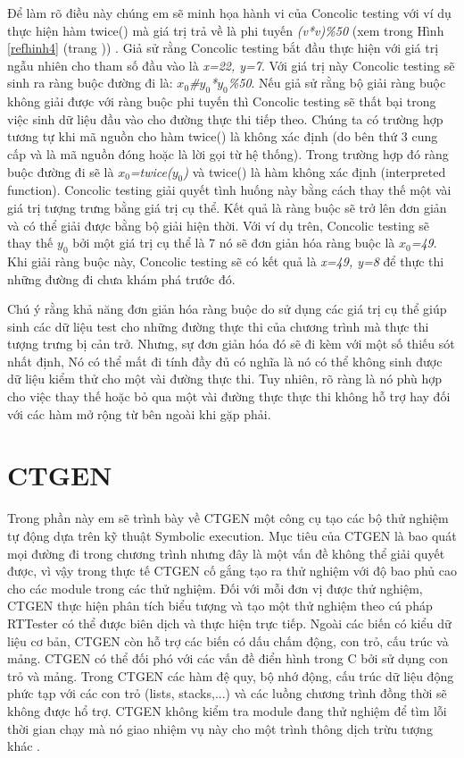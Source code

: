 \documentclass[12pt,a4paper]{report}
\begin{document}
\begin{enumerate}
Để làm rõ điều này chúng em sẽ minh họa hành vi của Concolic testing với ví dụ thực hiện hàm twice() mà giá trị trả về là phi tuyến \textit{(v*v)\%50} (xem trong Hình \ref{refhinh4} (trang \pageref{refhinh4})) . Giả sử rằng Concolic testing bắt đầu thực hiện với giá trị ngẫu nhiên cho tham số đầu vào là \textit{{x=22, y=7}}. Với giá trị này Concolic testing sẽ sinh ra ràng buộc đường đi là:  \textit{$x_0$\#$y_0$*$y_0$\%50}. Nếu giả sử rằng bộ giải ràng buộc không giải được với ràng buộc phi tuyến thì Concolic testing sẽ thất bại trong việc sinh dữ liệu đầu vào cho đường thực thi tiếp theo. Chúng ta có trường hợp tương tự khi mã nguồn cho hàm twice() là không xác định (do bên thứ 3 cung cấp và là mã nguồn đóng hoặc là lời gọi từ hệ thống). Trong trường hợp đó ràng buộc đường đi sẽ là \textit{$x_0$=twice($y_0$)} và twice() là hàm không xác định (interpreted function). Concolic testing giải quyết tình huống này bằng cách thay thế một vài giá trị tượng trưng bằng giá trị cụ thể. Kết quả là ràng buộc sẽ trở lên đơn giản và có thể giải được bằng bộ giải hiện thời. Với ví dụ trên, Concolic testing sẽ thay thế \textit{$y_0$} bởi một giá trị cụ thể là 7 nó sẽ đơn giản hóa ràng buộc là \textit{$x_0$=49}. Khi giải ràng buộc này, Concolic testing sẽ có kết quả là \textit{{x=49, y=8}} để thực thi những đường đi chưa khám phá trước đó.

Chú ý rằng khả năng đơn giản hóa ràng buộc do sử dụng các giá trị cụ thể giúp sinh các dữ liệu test cho những đường thực thi của chương trình mà thực thi tượng trưng bị cản trở. Nhưng, sự đơn giản hóa đó sẽ đi kèm với một số thiếu sót nhất định, Nó có thể mất đi tính đầy đủ có nghĩa là nó có thể không sinh được dữ liệu kiểm thử cho một vài đường thực thi. Tuy nhiên, rõ ràng là nó phù hợp cho việc thay thế hoặc bỏ qua một vài đường thực thực thi không hỗ trợ hay đối với các hàm mở rộng từ bên ngoài khi gặp phải.

\end{enumerate}

\section{CTGEN}
Trong phần này em sẽ trình bày về CTGEN một công cụ tạo các bộ thử nghiệm tự động dựa trên kỹ thuật Symbolic execution. Mục tiêu của CTGEN là bao quát mọi đường đi trong chương trình nhưng đây là một vấn đề không thể giải quyết được, vì vậy trong thực tế CTGEN cố gắng tạo ra thử nghiệm với độ bao phủ cao cho các module trong các thử nghiệm. Đối với mỗi đơn vị được thử nghiệm, CTGEN thực hiện phân tích biểu tượng và tạo một thử nghiệm theo cú pháp RTTester \cite{mollerverified} có thể được biên dịch và thực hiện trực tiếp. Ngoài các biến có kiểu dữ liệu cơ bản, CTGEN còn hỗ trợ các biến có dấu chấm động, con trỏ, cấu trúc và mảng. CTGEN có thể đối phó với các vấn đề điển hình trong C bởi sử dụng con trỏ và mảng. Trong CTGEN các hàm đệ quy, bộ nhớ động, cấu trúc dữ liệu động phức tạp với các con trỏ (lists, stacks,...) và các luồng chương trình đồng thời sẽ không được hổ trợ. CTGEN không kiểm tra module đang thử nghiệm để tìm lỗi thời gian chạy mà nó giao nhiệm vụ này cho một trình thông dịch trừu tượng khác \cite{peleska2011automated}.
\end{document}
